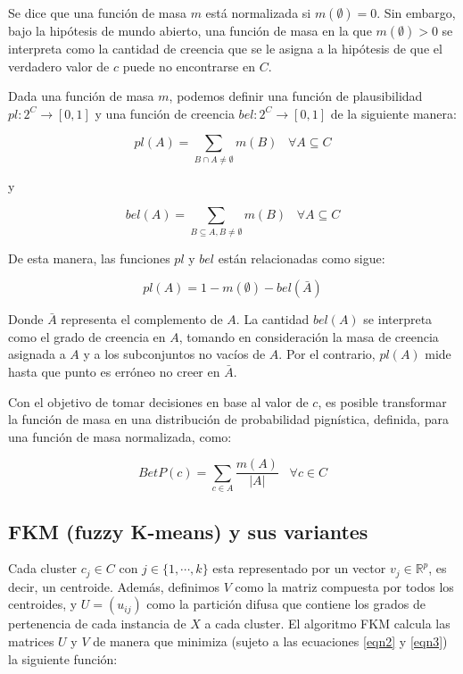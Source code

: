 Se dice que una función de masa $m$ está normalizada si $m(\emptyset) = 0$. Sin embargo, bajo la hipótesis de mundo abierto, una función de masa en la que $m(\emptyset) > 0$ se interpreta como la cantidad de creencia que se le asigna a la hipótesis de que el verdadero valor de $c$ puede no encontrarse en $C$.

Dada una función de masa $m$, podemos definir una función de plausibilidad $pl:2^C \rightarrow [0,1]$ y una función de creencia $bel: 2^C \rightarrow [0,1]$ de la siguiente manera:

\begin{equation}
pl(A) = \sum_{B \cap A \neq \emptyset} m(B) \;\;\; \forall A \subseteq C
\label{eqn4}
\end{equation}

y 

\begin{equation}
bel(A) = \sum_{B \subseteq A, B \neq \emptyset} m(B) \;\;\; \forall A \subseteq C
\label{eqn5}
\end{equation}

De esta manera, las funciones $pl$ y $bel$ están relacionadas como sigue:

\begin{equation}
pl(A) = 1 - m(\emptyset) - bel(\bar{A})
\label{eqn6}
\end{equation}

Donde $\bar{A}$ representa el complemento de $A$.  La cantidad $bel(A)$ se interpreta como el grado de creencia en $A$, tomando en consideración la masa de creencia asignada a $A$ y a los subconjuntos no vacíos de $A$. Por el contrario, $pl(A)$ mide hasta que punto es erróneo no creer en $\bar{A}$.

Con el objetivo de tomar decisiones en base al valor de $c$, es posible transformar la función de masa en una distribución de probabilidad pignística, definida, para una función de masa normalizada, como:

\begin{equation}
BetP(c) = \sum_{c \in A} \frac{m(A)}{|A|} \;\;\; \forall c \in C
\label{eqn7}
\end{equation}

\subsection{FKM (fuzzy K-means) y sus variantes}

Cada cluster $c_j \in C$ con $j \in \{1,\cdots,k\}$ esta representado por un vector $v_j \in \mathbb{R}^p$, es decir, un centroide. Además, definimos $V$ como la matriz compuesta por todos los centroides, y $U = (u_{ij})$ como la partición difusa que contiene los grados de pertenencia de cada instancia de $X$ a cada cluster. El algoritmo \acf{FKM} calcula las matrices $U$ y $V$ de manera que minimiza (sujeto a las ecuaciones \ref{eqn2} y \ref{eqn3}) la siguiente función:

